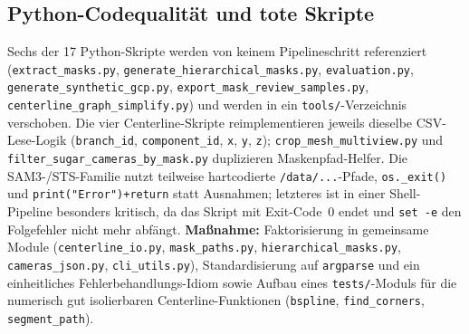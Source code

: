 \documentclass[12pt,a4paper]{article}
\begin{document}
\subsection{Python-Codequalität und tote Skripte}
Sechs der 17 Python-Skripte werden von keinem Pipelineschritt referenziert
(\texttt{extract\_masks.py}, \texttt{generate\_hierarchical\_masks.py},
\texttt{evaluation.py}, \texttt{generate\_synthetic\_gcp.py},
\texttt{export\_mask\_review\_samples.py}, \texttt{centerline\_graph\_simplify.py})
und werden in ein \texttt{tools/}-Verzeichnis verschoben. Die vier
Centerline-Skripte reimplementieren jeweils dieselbe CSV-Lese-Logik
(\texttt{branch\_id}, \texttt{component\_id}, \texttt{x}, \texttt{y},
\texttt{z}); \texttt{crop\_mesh\_multiview.py} und
\texttt{filter\_sugar\_cameras\_by\_mask.py} duplizieren Maskenpfad-Helfer. Die
SAM3-/STS-Familie nutzt teilweise hartcodierte \texttt{/data/...}-Pfade,
\texttt{os.\_exit()} und \texttt{print("Error")+return} statt Ausnahmen; letzteres
ist in einer Shell-Pipeline besonders kritisch, da das Skript mit Exit-Code~0
endet und \texttt{set -e} den Folgefehler nicht mehr abfängt. \textbf{Maßnahme:}
Faktorisierung in gemeinsame Module (\texttt{centerline\_io.py},
\texttt{mask\_paths.py}, \texttt{hierarchical\_masks.py},
\texttt{cameras\_json.py}, \texttt{cli\_utils.py}), Standardisierung auf
\texttt{argparse} und ein einheitliches Fehlerbehandlungs-Idiom sowie Aufbau
eines \texttt{tests/}-Moduls für die numerisch gut isolierbaren
Centerline-Funktionen (\texttt{bspline}, \texttt{find\_corners},
\texttt{segment\_path}).
\end{document}
